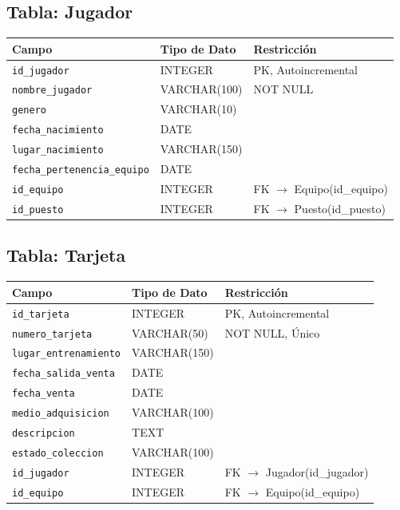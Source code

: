 \documentclass{article}
\begin{document}
\subsection*{Tabla: Jugador}
\begin{center}
\begin{tabular}{|l|l|p{6cm}|}
\hline
\textbf{Campo} & \textbf{Tipo de Dato} & \textbf{Restricción} \\
\hline
\texttt{id\_jugador} & INTEGER & PK, Autoincremental \\
\texttt{nombre\_jugador} & VARCHAR(100) & NOT NULL \\
\texttt{genero} & VARCHAR(10) &  \\
\texttt{fecha\_nacimiento} & DATE &  \\
\texttt{lugar\_nacimiento} & VARCHAR(150) &  \\
\texttt{fecha\_pertenencia\_equipo} & DATE &  \\
\texttt{id\_equipo} & INTEGER & FK $\rightarrow$ Equipo(id\_equipo) \\
\texttt{id\_puesto} & INTEGER & FK $\rightarrow$ Puesto(id\_puesto) \\
\hline
\end{tabular}
\end{center}

\subsection*{Tabla: Tarjeta}
\begin{center}
\begin{tabular}{|l|l|p{6cm}|}
\hline
\textbf{Campo} & \textbf{Tipo de Dato} & \textbf{Restricción} \\
\hline
\texttt{id\_tarjeta} & INTEGER & PK, Autoincremental \\
\texttt{numero\_tarjeta} & VARCHAR(50) & NOT NULL, Único \\
\texttt{lugar\_entrenamiento} & VARCHAR(150) &  \\
\texttt{fecha\_salida\_venta} & DATE &  \\
\texttt{fecha\_venta} & DATE &  \\
\texttt{medio\_adquisicion} & VARCHAR(100) &  \\
\texttt{descripcion} & TEXT &  \\
\texttt{estado\_coleccion} & VARCHAR(100) &  \\
\texttt{id\_jugador} & INTEGER & FK $\rightarrow$ Jugador(id\_jugador) \\
\texttt{id\_equipo} & INTEGER & FK $\rightarrow$ Equipo(id\_equipo) \\
\hline
\end{tabular}
\end{center}
\end{document}
